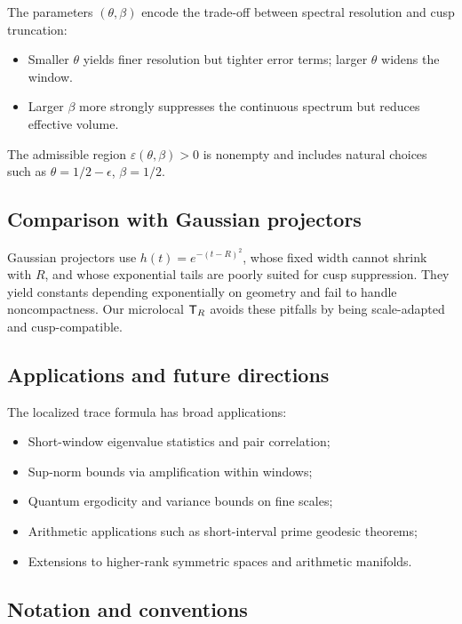 The parameters $(\theta,\beta)$ encode the trade-off between spectral resolution and cusp truncation:
\begin{itemize}
  \item Smaller $\theta$ yields finer resolution but tighter error terms; larger $\theta$ widens the window.
  \item Larger $\beta$ more strongly suppresses the continuous spectrum but reduces effective volume.
\end{itemize}
The admissible region $\varepsilon(\theta,\beta)>0$ is nonempty and includes natural choices such as $\theta=1/2-\epsilon$, $\beta=1/2$.

\subsection{Comparison with Gaussian projectors}\label{subsec:gaussian}

Gaussian projectors use $h(t)=e^{-(t-R)^2}$, whose fixed width cannot shrink with $R$, and whose exponential tails are poorly suited for cusp suppression. They yield constants depending exponentially on geometry and fail to handle noncompactness. Our microlocal $\mathsf{T}_R$ avoids these pitfalls by being scale-adapted and cusp-compatible.

\subsection{Applications and future directions}\label{subsec:applications}

The localized trace formula has broad applications:
\begin{itemize}
  \item Short-window eigenvalue statistics and pair correlation;
  \item Sup-norm bounds via amplification within windows;
  \item Quantum ergodicity and variance bounds on fine scales;
  \item Arithmetic applications such as short-interval prime geodesic theorems;
  \item Extensions to higher-rank symmetric spaces and arithmetic manifolds.
\end{itemize}

\subsection{Notation and conventions}\label{subsec:notation}

